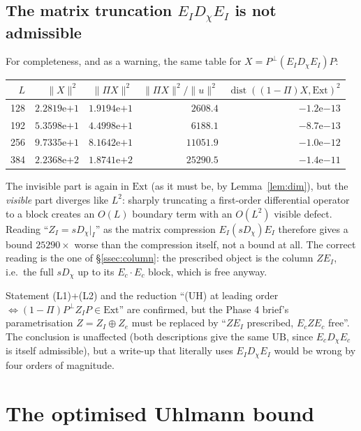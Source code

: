 \documentclass[11pt]{article}
\begin{document}
\subsection{The matrix truncation $E_ID_\chi E_I$ is not admissible}
For completeness, and as a warning, the same table for $X=P^\perp(E_ID_\chi E_I)P$:
\begin{center}\small
\begin{tabular}{rrrrr}
\toprule
$L$&$\|X\|^2$&$\|\Pi X\|^2$&$\|\Pi X\|^2/\|u\|^2$&$\operatorname{dist}((1-\Pi)X,\mathrm{Ext})^2$\\\midrule
128&$2.2819\mathrm{e}{+1}$&$1.9194\mathrm{e}{+1}$&$2608.4$&$-1.2\mathrm{e}{-13}$\\
192&$5.3598\mathrm{e}{+1}$&$4.4998\mathrm{e}{+1}$&$6188.1$&$-8.7\mathrm{e}{-13}$\\
256&$9.7335\mathrm{e}{+1}$&$8.1642\mathrm{e}{+1}$&$11051.9$&$-1.0\mathrm{e}{-12}$\\
384&$2.2368\mathrm{e}{+2}$&$1.8741\mathrm{e}{+2}$&$25290.5$&$-1.4\mathrm{e}{-11}$\\
\bottomrule
\end{tabular}
\end{center}
The invisible part is again in $\mathrm{Ext}$ (as it must be, by Lemma~\ref{lem:dim}), but
the \emph{visible} part diverges like $L^2$: sharply truncating a first-order differential
operator to a block creates an $O(L)$ boundary term with an $O(L^2)$ visible defect.  Reading
``$Z_I=sD_\chi|_I$'' as the matrix compression $E_I(sD_\chi)E_I$ therefore gives a bound
$25290\times$ worse than the compression itself, not a bound at all.  The correct reading is
the one of \S\ref{ssec:column}: the prescribed object is the column $ZE_I$, i.e.\ the full
$sD_\chi$ up to its $E_c\cdot E_c$ block, which is free anyway.

\begin{verdictgap}
Statement (L1)+(L2) and the reduction ``(UH) at leading order $\iff(1-\Pi)P^\perp Z_IP\in\mathrm{Ext}$''
are confirmed, but the Phase 4 brief's parametrisation $Z=Z_I\oplus Z_e$ must be replaced by
``$ZE_I$ prescribed, $E_cZE_c$ free''.  The conclusion is unaffected (both descriptions
give the same $\mathrm{UB}$, since $E_cD_\chi E_c$ is itself admissible), but a write-up
that literally uses $E_ID_\chi E_I$ would be wrong by four orders of magnitude.
\end{verdictgap}


\section{The optimised Uhlmann bound}\label{sec:ub}
\end{document}
